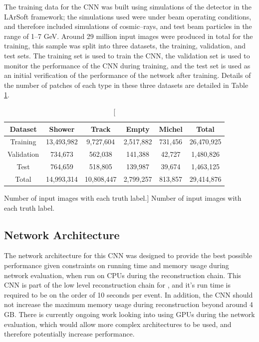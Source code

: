 The training data for the CNN was built using simulations of the \protodune{}
detector in the LArSoft framework; the simulations used were under beam
operating conditions, and therefore included simulations of cosmic--rays, and
test beam particles in the range of 1--7 GeV. Around 29 million input images
were produced in total for the training, this sample was split into three
datasets, the training, validation, and test sets. The training set is used to
train the CNN, the validation set is used to monitor the performance of the CNN
during training, and the test set is used as an initial verification of the 
performance of the network after training. Details of the number of patches of
each type in these three datasets are detailed in Table \ref{tab:patches}.

\begin{table}
	\centering
	\begin{tabular}{c|c|c|c|c|c}
		Dataset    & Shower     & Track      & Empty     & Michel  & Total      \\ \hline
		Training   & 13,493,982 & 9,727,604  & 2,517,882 & 731,456 & 26,470,925 \\
		Validation & 734,673    & 562,038    & 141,388   & 42,727  & 1,480,826  \\
		Test       & 764,659    & 518,805    & 139,987   & 39,674  & 1,463,125  \\ \hline
		Total      & 14,993,314 & 10,808,447 & 2,799,257 & 813,857 & 29,414,876
	\end{tabular}
	\caption
	[Number of input images with each truth label.]
	{Number of input images with each truth label.}
	\label{tab:patches}
\end{table}

\subsection{Network Architecture}

The network architecture for this CNN was designed to provide the best possible
performance given constraints on running time and memory usage during network
evaluation, when run on CPUs during the \protodune{} reconstruction chain. 
This CNN is part of the low level reconstruction chain for \protodune{}, and 
it's run time is required to be on the order of 10 seconds per event. In 
addition, the CNN should not increase the maximum memory usage during 
reconstruction beyond around 4 GB. There is currently ongoing work looking 
into using GPUs during the network evaluation, which would allow more complex 
architectures to be used, and therefore potentially increase performance.

